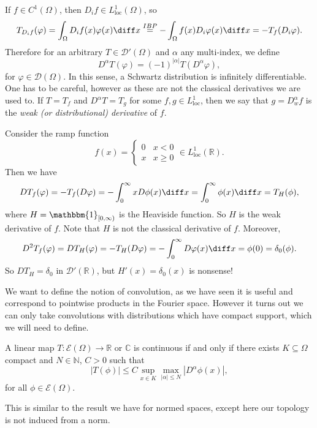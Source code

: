 \documentclass[12pt]{article}
\begin{document}
If $f \in C^1(\Omega)$, then $D_i f \in L^1_{\mathrm{loc}}(\Omega)$, so
\[
	T_{D_i f}(\varphi) = \int_{\Omega} D_i f(x) \varphi(x) \diff x \overset{IBP}= - \int_{\Omega}f(x) D_i \varphi(x) \diff x = - T_f(D_i \varphi).
\]
Therefore for an arbitrary $T \in \mathcal{D}'(\Omega)$ and $\alpha$ any multi-index, we define
\[
D^\alpha T(\varphi) = (-1)^{|\alpha|} T(D^\alpha \varphi),
\]
for $\varphi \in \mathcal{D}(\Omega)$. In this sense, a Schwartz distribution is infinitely differentiable. One has to be careful, however as these are not the classical derivatives we are used to. If $T = T_f$ and $D^\alpha T = T_g$ for some $f, g \in L^1_{\mathrm{loc}}$, then we say that $g = D^\alpha_wf$ is the \emph{weak (or distributional) derivative} of $f$.

\begin{exbox} 
	Consider the ramp function
	\[
	f(x) =
	\begin{cases}
		0 & x < 0 \\
		x & x \geq 0
	\end{cases}
	\in L^1_{\mathrm{loc}}(\mathbb{R}).
	\]
	Then we have
	\[
	D T_f(\varphi) = - T_f(D \varphi) = - \int_0^\infty x D \phi(x) \diff x = \int_0^{\infty} \phi(x) \diff x = T_H(\phi),
	\]
	where $H = \mathbbm{1}_{[0, \infty)}$ is the Heaviside function. So $H$ is the weak derivative of $f$. Note that $H$ is not the classical derivative of $f$. Moreover,
	\[
	D^2 T_f(\varphi) = D T_H(\varphi) = - T_H (D\varphi) = - \int_0^\infty D \varphi(x) \diff x = \phi(0) = \delta_0(\phi).
	\]
	So $DT_H = \delta_0$ in $\mathcal{D}'(\mathbb{R})$, but $H'(x) = \delta_0(x)$ is nonsense!
\end{exbox}

We want to define the notion of convolution, as we have seen it is useful and correspond to pointwise products in the Fourier space. However it turns out we can only take convolutions with distributions which have compact support, which we will need to define.

\begin{proposition}
	A linear map $T : \mathcal{E}(\Omega) \to \mathbb{R}$ or $\mathbb{C}$ is continuous if and only if there exists $K \subseteq \Omega$ compact and $N \in \mathbb{N}$, $C > 0$ such that
	\[
		|T(\phi)| \leq C \sup_{x \in K} \max_{|\alpha|\leq N} |D^\alpha \phi(x)|, \tag{$\dagger$}
	\]
	for all $\phi \in \mathcal{E}(\Omega)$.
\end{proposition}

This is similar to the result we have for normed spaces, except here our topology is not induced from a norm.
\end{document}
